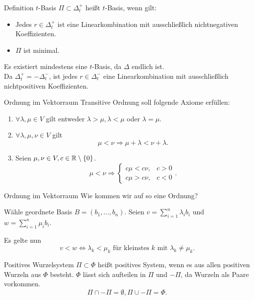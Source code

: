 \documentclass[18pt,draft]{beamer}
\begin{document}
\begin{frame}{Definition \( t \)-Basis}
    \( \Pi \subset \Delta_t^+ \) heißt \( t \)-Basis, 
    wenn gilt:
    \begin{itemize}
        \item Jedes \( r \in \Delta_t^+ \) ist 
        eine Linearkombination mit ausschließlich 
        nichtnegativen Koeffizienten.
        \item \( \Pi \) ist minimal.
    \end{itemize}
    Es existiert mindestens eine \( t \)-Basis, 
    da \( \Delta \) endlich ist.\\
    Da \( \Delta_t^+ = - \Delta_t^- \), ist jedes 
    \( r \in \Delta_t^- \) eine Linearkombination 
    mit ausschließlich nichtpositiven Koeffizienten.
\end{frame}

\begin{frame}{Ordnung im Vektorraum}
    Transitive Ordnung soll folgende Axiome erfüllen:
    \begin{enumerate}
        \item \( \forall \lambda, \mu \in V \) gilt 
        entweder \( \lambda > \mu, \lambda < \mu \) 
        oder \( \lambda = \mu \).
        \item \( \forall \lambda, \mu, \nu \in V \) 
        gilt 
        \[ \mu < \nu 
        \Rightarrow \mu + \lambda < \nu + \lambda. \]
        \item Seien \( \mu, \nu \in V, 
        c \in \mathbb{R} \setminus \{0\} \).
        \[ \mu < \nu \Rightarrow 
        \begin{cases}
            c \mu < c \nu, & c > 0 \\
            c \mu > c \nu, & c < 0
        \end{cases}. \]
    \end{enumerate}
\end{frame}
\begin{frame}{Ordnung im Vektorraum}
    Wie kommen wir auf so eine Ordnung?

    Wähle geordnete Basis 
    \( B = (b_1, \ldots, b_n) \). 
    Seien \( v = \sum_{i=1}^n \lambda_i b_i \)
    und \( w = \sum_{i=1}^n \mu_i b_i \).
    
    Es gelte nun
    \[ v < w \Leftrightarrow
    \lambda_k < \mu_k \text{ für kleinstes } k \text{ mit } 
    \lambda_k \neq \mu_k. \]
\end{frame}

\begin{frame}{Positives Wurzelsystem}
    \( \Pi \subset \Phi \) heißt positives 
    System, wenn es aus allen positiven Wurzeln 
    aus \( \Phi \) besteht.
    \( \Phi \) lässt sich aufteilen in 
    \( \Pi \) und \( -\Pi \), da Wurzeln als Paare 
    vorkommen.
    \[ \Pi \cap -\Pi = \emptyset, \Pi \cup -\Pi = \Phi. \]
\end{frame}
\end{document}
